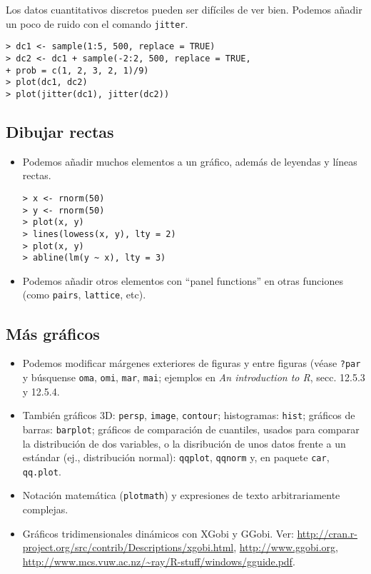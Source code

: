 Los datos cuantitativos discretos pueden ser difíciles de ver bien.
Podemos añadir un poco de ruido con el comando \verb"jitter".
\begin{verbatim}
> dc1 <- sample(1:5, 500, replace = TRUE)
> dc2 <- dc1 + sample(-2:2, 500, replace = TRUE,
+ prob = c(1, 2, 3, 2, 1)/9)
> plot(dc1, dc2)
> plot(jitter(dc1), jitter(dc2))
\end{verbatim}

\newslide

\subsection{Dibujar rectas}

\begin{itemize}
\item Podemos añadir muchos elementos a un gráfico, además
de leyendas y líneas rectas.
\begin{verbatim}
> x <- rnorm(50)
> y <- rnorm(50)
> plot(x, y)
> lines(lowess(x, y), lty = 2)
> plot(x, y)
> abline(lm(y ~ x), lty = 3)
\end{verbatim}
\item Podemos añadir otros elementos con ``panel functions''
en otras funciones (como \verb"pairs", \verb"lattice", etc).
\end{itemize}

\newslide

\subsection{Más gráficos}

\begin{itemize}
\item Podemos modificar márgenes exteriores de figuras y entre
figuras (véase \verb"?par" y búsquense \verb"oma", \verb"omi",
\verb"mar", \verb"mai"; ejemplos en \emph{An introduction to R},
secc. 12.5.3 y 12.5.4.

\item También gráficos 3D: \verb"persp", \verb"image",
\verb"contour"; histogramas: \verb"hist"; gráficos de barras:
\verb"barplot"; gráficos de comparación de cuantiles, usados para
comparar la distribución de dos variables, o la disribución de
unos datos frente a un estándar (ej., distribución normal):
\verb"qqplot", \verb"qqnorm" y, en paquete \verb"car",
\verb"qq.plot".

\item Notación matemática (\verb"plotmath") y expresiones de texto
arbitrariamente complejas.

\item Gráficos tridimensionales dinámicos con XGobi y GGobi. Ver:
\url{http://cran.r-project.org/src/contrib/Descriptions/xgobi.html},
\url{http://www.ggobi.org},
\url{http://www.mcs.vuw.ac.nz/~ray/R-stuff/windows/gguide.pdf}.
\end{itemize}

